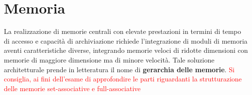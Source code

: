 \chapter{Memoria}
La realizzazione di memorie centrali con elevate prestazioni in termini di tempo di accesso e capacità di archiviazione richiede l'integrazione di moduli di memoria aventi caratteristiche diverse, integrando memorie veloci di ridotte dimensioni con memorie di maggiore dimensione ma di minore velocità. Tale soluzione architetturale prende in letteratura il nome di \textbf{gerarchia delle memorie}.
\textcolor{red}{Si consiglia, ai fini dell'esame di approfondire le parti riguardanti la strutturazione delle memorie set-associative e full-associative}






